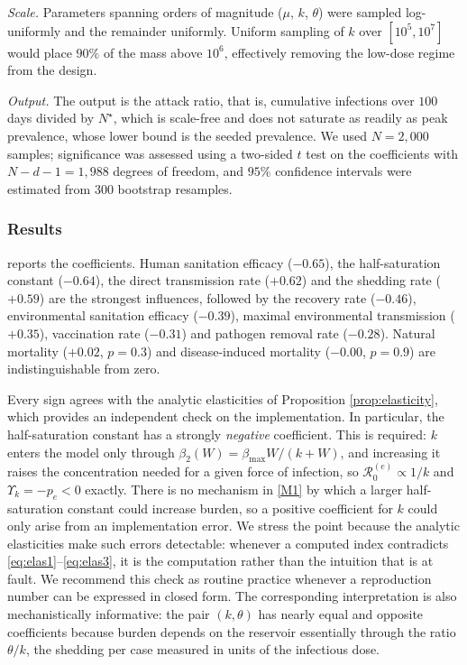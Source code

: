 \documentclass[11pt]{article}
\theoremstyle{plain}
\theoremstyle{definition}
\theoremstyle{remark}
\newcommand{\Rze}{\mathcal{R}_0^{(e)}}
\begin{document}
\emph{Scale.} Parameters spanning orders of magnitude ($\mu$, $k$, $\theta$) were sampled log-uniformly and the remainder uniformly. Uniform sampling of $k$ over $[10^5,10^7]$ would place $90\%$ of the mass above $10^6$, effectively removing the low-dose regime from the design.

\emph{Output.} The output is the attack ratio, that is, cumulative infections over $100$ days divided by $N^\star$, which is scale-free and does not saturate as readily as peak prevalence, whose lower bound is the seeded prevalence. We used $N=2{,}000$ samples; significance was assessed using a two-sided $t$ test on the coefficients with $N-d-1=1{,}988$ degrees of freedom, and $95\%$ confidence intervals were estimated from $300$ bootstrap resamples.

\subsubsection{Results}

 reports the coefficients. Human sanitation efficacy ($-0.65$), the half-saturation constant ($-0.64$), the direct transmission rate ($+0.62$) and the shedding rate ($+0.59$) are the strongest influences, followed by the recovery rate ($-0.46$), environmental sanitation efficacy ($-0.39$), maximal environmental transmission ($+0.35$), vaccination rate ($-0.31$) and pathogen removal rate ($-0.28$). Natural mortality ($+0.02$, $p=0.3$) and disease-induced mortality ($-0.00$, $p=0.9$) are indistinguishable from zero.

Every sign agrees with the analytic elasticities of Proposition \ref{prop:elasticity}, which provides an independent check on the implementation. In particular, the half-saturation constant has a strongly \emph{negative} coefficient. This is required: $k$ enters the model only through $\beta_2(W)=\beta_{\max}W/(k+W)$, and increasing it raises the concentration needed for a given force of infection, so $\Rze\propto1/k$ and $\Upsilon_k=-p_e<0$ exactly. There is no mechanism in \eqref{M1} by which a larger half-saturation constant could increase burden, so a positive coefficient for $k$ could only arise from an implementation error. We stress the point because the analytic elasticities make such errors detectable: whenever a computed index contradicts \eqref{eq:elas1}--\eqref{eq:elas3}, it is the computation rather than the intuition that is at fault. We recommend this check as routine practice whenever a reproduction number can be expressed in closed form. The corresponding interpretation is also mechanistically informative: the pair $(k,\theta)$ has nearly equal and opposite coefficients because burden depends on the reservoir essentially through the ratio $\theta/k$, the shedding per case measured in units of the infectious dose.
\end{document}
